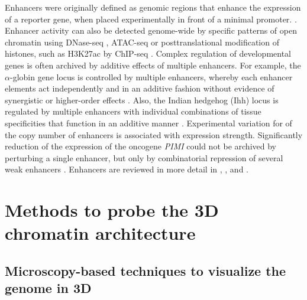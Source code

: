 \documentclass[a4paper,twoside=true,openright,parskip=full,chapterprefix=true,11pt,headings=normal,bibliography=totoc,listof=totoc,titlepage=on,captions=tableabove,draft=false]{scrreprt}
\theoremstyle{definition}
\theoremstyle{definition}
\theoremstyle{definition}
\theoremstyle{remark}
\begin{document}
Enhancers were originally defined as genomic regions that enhance the
expression of a reporter gene, when placed experimentally in front of a
minimal promoter. \citep{Banerji1981, Shlyueva2014}. Enhancer activity
can also be detected genome-wide by specific patterns of open chromatin
using DNase-seq \citep{Song2010}, ATAC-seq \citep{Buenrostro2013} or
posttranslational modification of histones, such as H3K27ac by ChIP-seq
\citep{Creyghton2010}. Complex regulation of developmental genes is
often archived by additive effects of multiple enhancers. For example,
the \(\alpha\)-globin gene locus is controlled by multiple enhancers,
whereby each enhancer elements act independently and in an additive
fashion without evidence of synergistic or higher-order effects
\citep{Hay2016}. Also, the Indian hedgehog (Ihh) locus is regulated by
multiple enhancers with individual combinations of tissue specificities
that function in an additive manner \citep{Will2017}. Experimental
variation for of the copy number of enhancers is associated with
expression strength. Significantly reduction of the expression of the
oncogene \emph{PIMI} could not be archived by perturbing a single
enhancer, but only by combinatorial repression of several weak enhancers
\citep{Xie2017}. Enhancers are reviewed in more detail in
\citet{Spitz2012}, \citet{Andrey2017}, and \citet{Long2016}.

\hypertarget{methods-to-probe-the-3d-chromatin-architecture}{%
\section{Methods to probe the 3D chromatin
architecture}\label{methods-to-probe-the-3d-chromatin-architecture}}

\hypertarget{microscopy-based-techniques-to-visualize-the-genome-in-3d}{%
\subsection{Microscopy-based techniques to visualize the genome in
3D}\label{microscopy-based-techniques-to-visualize-the-genome-in-3d}}
\end{document}
